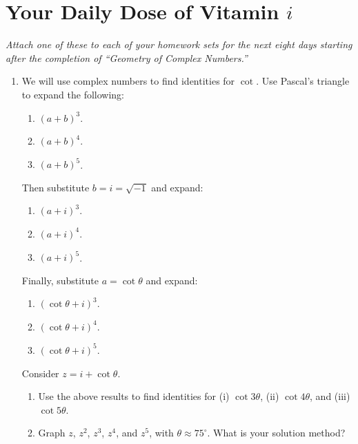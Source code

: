 \documentclass[../gatm.tex]{subfiles}
\begin{document}
\section{Your Daily Dose of Vitamin $i$}

\newcommand{\Arg} {\operatorname{Arg}}
\newcommand{\cis} {\operatorname{cis}}
\newcommand{\Real} {\operatorname{Re}}
\newcommand{\Imag} {\operatorname{Im}}

\textit{Attach one of these to each of your homework sets for the next eight days starting after the completion of ``Geometry of Complex Numbers.''}


\begin{enumerate}
\item We will use complex numbers to find identities for $\cot$. Use Pascal's triangle to expand the following:
\begin{multicols}{3}
\begin{enumerate}
\item $(a+b)^3$.
\item $(a+b)^4$.
\item $(a+b)^5$.
\setcounter{vit_i_problem_ii}{\value{enumii}}
\end{enumerate}
\end{multicols}
Then substitute $b=i=\sqrt{-1}$ and expand:
\begin{multicols}{3}
\begin{enumerate}
\setcounter{enumii}{\value{vit_i_problem_ii}}
\item $(a+i)^3$.
\item $(a+i)^4$.
\item $(a+i)^5$.
\setcounter{vit_i_problem_ii}{\value{enumii}}
\end{enumerate}
\end{multicols}
Finally, substitute $a=\cot \theta$ and expand:
\begin{multicols}{3}
\begin{enumerate}
\setcounter{enumii}{\value{vit_i_problem_ii}}
\item $(\cot \theta +i)^3$.
\item $(\cot \theta +i)^4$.
\item $(\cot \theta +i)^5$.
\setcounter{vit_i_problem_ii}{\value{enumii}}
\end{enumerate}
\end{multicols}
Consider $z=i+\cot\theta$.
\begin{enumerate}
\setcounter{enumii}{\value{vit_i_problem_ii}}
\item Use the above results to find identities for (i) $\cot 3\theta$, (ii) $\cot 4\theta$, and (iii) $\cot 5\theta$.
\item Graph $z$, $z^2$, $z^3$, $z^4$, and $z^5$, with $\theta \approx 75^\circ$. What is your solution method?
\end{enumerate}


\end{enumerate}
\end{document}
